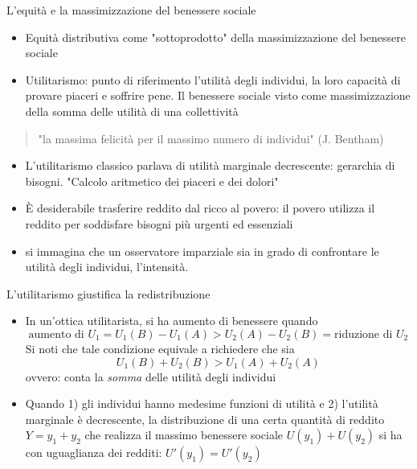 \documentclass[aspectratio=64,11pt]{beamer}
\begin{document}
\begin{frame}{L'equità e la massimizzazione del benessere sociale}
\begin{itemize}
\item \alert{Equità distributiva} come "sottoprodotto" della massimizzazione del
benessere sociale
\item \alert{Utilitarismo}: punto di riferimento l'utilità degli individui, la loro
capacità di provare piaceri e soffrire pene. Il benessere sociale visto come
massimizzazione della somma delle utilità di una collettività
\end{itemize}
\begin{quote}
"la massima felicità per il massimo numero di individui" (J. Bentham)
\end{quote}
\begin{itemize}
\item L'utilitarismo classico parlava di utilità marginale decrescente: gerarchia
di bisogni. "Calcolo aritmetico dei piaceri e dei dolori"
\item È desiderabile trasferire reddito dal ricco al povero: il povero utilizza il
reddito per soddisfare bisogni più urgenti ed essenziali
\item si immagina che un osservatore imparziale sia in grado di confrontare le
utilità degli individui, l'intensità.
\end{itemize}
\end{frame}

\begin{frame}{L'utilitarismo giustifica la redistribuzione}
\begin{itemize}
\item In un'ottica utilitarista, si ha aumento di benessere quando 
\begin{equation*}
\text{aumento di $U_{1}$} = U_{1}(B)-U_{1}(A) > U_{2}(A)-U_{2}(B) =
\text{riduzione di $U_{2}$}
\end{equation*}
Si noti che tale condizione equivale a richiedere che sia
\begin{equation*}
U_{1}(B)+U_{2}(B) >  U_{1}(A)+U_{2}(A)
\end{equation*}
ovvero: conta la \emph{somma} delle utilità degli individui
\item Quando 1) gli individui hanno medesime funzioni di utilità e 2) l'utilità
marginale è decrescente, la distribuzione di una certa quantità di reddito
$Y=y_1+y_2$ che realizza il massimo benessere sociale $U(y_1)+U(y_2)$ si ha con
uguaglianza dei redditi: $U'(y_{1})=U'(y_{2})$
\end{itemize}
\end{frame}
\end{document}
